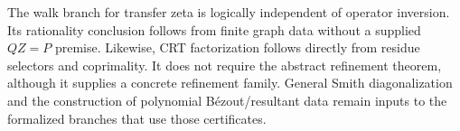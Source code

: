 The walk branch for transfer zeta is logically independent of operator
inversion. Its rationality conclusion follows from finite graph data without
a supplied $QZ=P$ premise. Likewise, CRT factorization follows directly from
residue selectors and coprimality. It does not require the abstract refinement
theorem, although it supplies a concrete refinement family. General Smith
diagonalization and the construction of polynomial B\'ezout/resultant data
remain inputs to the formalized branches that use those certificates.

